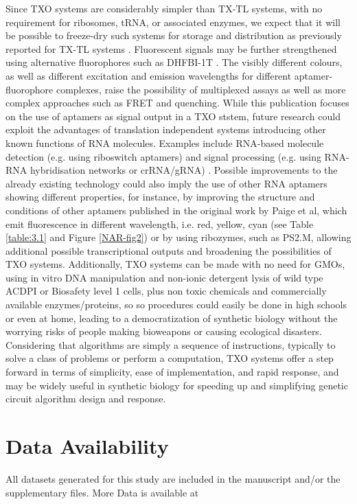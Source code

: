 Since TXO systems are considerably simpler than TX-TL systems, with no requirement for ribosomes, tRNA, or associated enzymes, we expect that it will be possible to freeze-dry such systems for storage and distribution as previously reported for TX-TL systems \citep{grawe2019paper,pardee2014based}. Fluorescent signals may be further strengthened using alternative fluorophores such as DHFBI-1T \citep{song2014plug}. The visibly different colours, as well as different excitation and emission wavelengths for different aptamer-fluorophore complexes, raise the possibility of multiplexed assays as well as more complex approaches such as FRET and quenching. While this publication focuses on the use of aptamers as signal output in a TXO ststem, future research could exploit the advantages of translation independent systems introducing other known functions of RNA molecules. Examples include RNA-based molecule detection (e.g. using riboswitch aptamers) and signal processing (e.g. using RNA-RNA hybridisation networks or crRNA/gRNA) \citep{alam2017fluorescent, DasGupta2015a, etzel2017synthetic, patel2018synthetic, rodrigo2017model, jaffrey2018rna}. Possible improvements to the already existing technology could also imply the use of other RNA aptamers showing different properties, for instance, by improving the structure and conditions of other aptamers published in the original work by Paige et al, which emit fluorescence in different wavelength, i.e. red, yellow, cyan (see Table \ref{table:3.1} and Figure \ref{NAR-fig2}) or by using ribozymes, such as PS2.M, allowing additional possible transcriptional outputs and broadening the possibilities of TXO systems.
Additionally, TXO systems can be made with no need for GMOs, using in vitro DNA manipulation and non-ionic detergent lysis of wild type ACDPI or Biosafety level 1 cells, plus non toxic chemicals and commercially available enzymes/proteins, so so procedures could easily be done in high schools or even at home, leading to a democratization of synthetic biology without the worrying risks of people making bioweapons or causing ecological disasters. Considering that algorithms are simply a sequence of instructions, typically to solve a class of problems or perform a computation, TXO systems offer a step forward in terms of simplicity, ease of implementation, and rapid response, and may be widely useful in synthetic biology for speeding up and simplifying genetic circuit algorithm design and response.



\section{Data Availability}
All datasets generated for this study are included in the manuscript and/or the supplementary files. More Data is available at 

